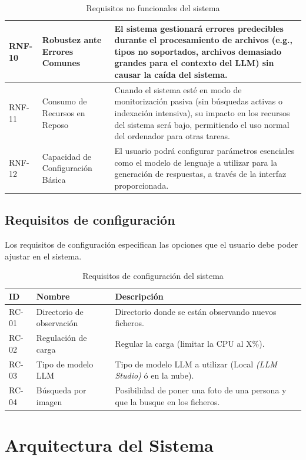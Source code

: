 \begin{table}[H]
\begin{tabular}{|p{1cm}|p{4cm}|p{9cm}|}
\hline
RNF-10 & Robustez ante Errores Comunes & El sistema gestionará errores predecibles durante el procesamiento de archivos (e.g., tipos no soportados, archivos demasiado grandes para el contexto del LLM) sin causar la caída del sistema. \\
\hline
RNF-11 & Consumo de Recursos en Reposo & Cuando el sistema esté en modo de monitorización pasiva (sin búsquedas activas o indexación intensiva), su impacto en los recursos del sistema será bajo, permitiendo el uso normal del ordenador para otras tareas. \\
\hline
RNF-12 & Capacidad de Configuración Básica & El usuario podrá configurar parámetros esenciales como el modelo de lenguaje a utilizar para la generación de respuestas, a través de la interfaz proporcionada. \\
\hline
\end{tabular}
\caption{Requisitos no funcionales del sistema}
\label{tab:req_no_funcionales}
\end{table}

\subsection{Requisitos de configuración}
Los requisitos de configuración especifican las opciones que el usuario debe poder ajustar en el sistema.

\begin{table}[H]
\centering
\begin{tabular}{|p{1cm}|p{4cm}|p{9cm}|}
\hline
\textbf{ID} & \textbf{Nombre} & \textbf{Descripción} \\
\hline
RC-01 & Directorio de observación & Directorio donde se están observando nuevos ficheros. \\
\hline
RC-02 & Regulación de carga & Regular la carga (limitar la CPU al X\%). \\
\hline
RC-03 & Tipo de modelo LLM & Tipo de modelo LLM a utilizar (Local \textit{(LLM Studio)} ó en la nube). \\
\hline
RC-04 & Búsqueda por imagen & Posibilidad de poner una foto de una persona y que la busque en los ficheros. \\
\hline
\end{tabular}
\caption{Requisitos de configuración del sistema}
\label{tab:req_configuracion}
\end{table}

\section{Arquitectura del Sistema}
\label{sec:arquitectura_sistema}

